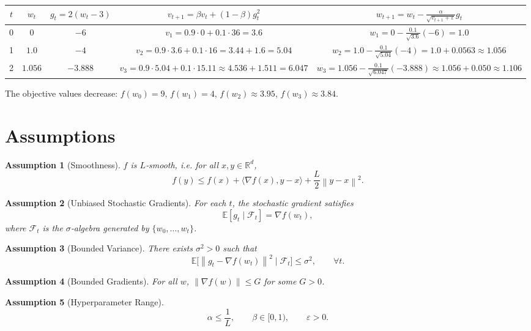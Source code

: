 \documentclass{article}
\newcommand{\EE}{\mathbb{E}}
\newcommand{\RR}{\mathbb{R}}
\newcommand{\norm}[1]{\left\lVert#1\right\rVert}
\newtheorem{assumption}{Assumption}
\begin{document}
\begin{center}
\begin{tabular}{c c c c c}
\toprule
$t$ & $w_{t}$ & $g_{t}=2(w_{t}-3)$ & $v_{t+1}= \beta v_{t}+(1-\beta)g_{t}^{2}$ & $w_{t+1}=w_{t}-\frac{\alpha}{\sqrt{v_{t+1}+\varepsilon}}g_{t}$ \\
\midrule
0 & $0$ & $-6$ & $v_{1}=0.9\cdot0+0.1\cdot36=3.6$ & $w_{1}=0-\frac{0.1}{\sqrt{3.6}}(-6)=1.0$ \\
1 & $1.0$ & $-4$ & $v_{2}=0.9\cdot3.6+0.1\cdot16=3.44+1.6=5.04$ & $w_{2}=1.0-\frac{0.1}{\sqrt{5.04}}(-4)=1.0+0.0563\approx1.056$ \\
2 & $1.056$ & $-3.888$ & $v_{3}=0.9\cdot5.04+0.1\cdot15.11\approx4.536+1.511=6.047$ &
$w_{3}=1.056-\frac{0.1}{\sqrt{6.047}}(-3.888)\approx1.056+0.050\approx1.106$ \\
\bottomrule
\end{tabular}
\end{center}
The objective values decrease: $f(w_{0})=9$, $f(w_{1})=4$, $f(w_{2})\approx3.95$, $f(w_{3})\approx3.84$.

\newpage
\section*{Assumptions}
\begin{assumption}[Smoothness]\label{as:smooth}
$f$ is $L$‑smooth, i.e. for all $x,y\in\RR^{d}$,
\[
f(y)\le f(x)+\langle\nabla f(x),y-x\rangle+\frac{L}{2}\norm{y-x}^{2}.
\tag{3}
\]
\end{assumption}
\begin{assumption}[Unbiased Stochastic Gradients]\label{as:unbiased}
For each $t$, the stochastic gradient satisfies
\[
\EE[g_{t}\mid\mathcal{F}_{t}]=\nabla f(w_{t}),
\]
where $\mathcal{F}_{t}$ is the $\sigma$‑algebra generated by $\{w_{0},\dots,w_{t}\}$.
\end{assumption}
\begin{assumption}[Bounded Variance]\label{as:variance}
There exists $\sigma^{2}>0$ such that
\[
\EE\bigl[\norm{g_{t}-\nabla f(w_{t})}^{2}\mid\mathcal{F}_{t}\bigr]\le\sigma^{2},
\qquad\forall t.
\tag{4}
\]
\end{assumption}
\begin{assumption}[Bounded Gradients]\label{as:gradbound}
For all $w$, $\norm{\nabla f(w)}\le G$ for some $G>0$.
\end{assumption}
\begin{assumption}[Hyperparameter Range]\label{as:hyper}
\[
\alpha\le\frac{1}{L},\qquad
\beta\in[0,1),\qquad
\varepsilon>0.
\tag{5}
\]
\end{assumption}
\end{document}
